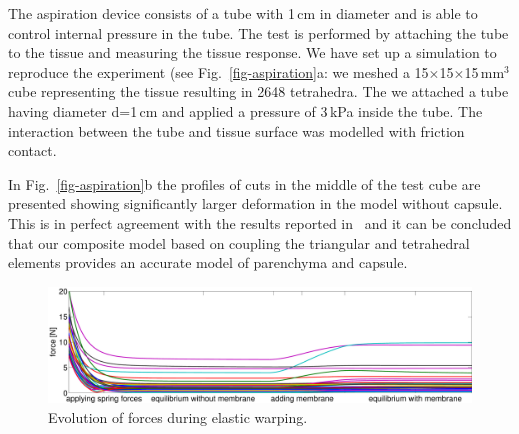\documentclass{llncs}
\begin{document}
The aspiration device consists of a tube with 1\,cm in diameter and is able
to control internal pressure in the tube. The test is performed by
attaching the tube to the tissue and measuring the tissue response. We
have set up a simulation to reproduce the experiment (see Fig.~\ref{fig-aspiration}a: we meshed a 15$\times$15$\times$15\,mm$^3$ 
cube representing the tissue 
resulting in 2648 tetrahedra. The we attached a tube having diameter d=1\,cm 
and applied a pressure of 3\,kPa inside the tube. The interaction between the tube and 
tissue surface was modelled with friction contact. 

In Fig.~\ref{fig-aspiration}b the profiles of cuts in the middle of the
test cube are presented showing significantly larger deformation in the model without capsule. This is in perfect 
agreement with the results reported in~\cite{Hollenstein2006} and it can be concluded that 
our composite model based on coupling the triangular and tetrahedral elements provides an accurate 
model of parenchyma and capsule.


\begin{figure}[t]
  \centering
    \includegraphics[width=.95\textwidth]{forceEvolution.pdf}
  \caption{\label{f:forceEvol}Evolution of forces during elastic warping.}
\end{figure}
\end{document}
